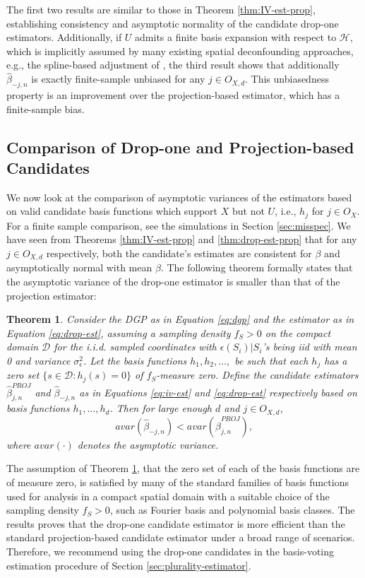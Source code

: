 \documentclass[
  12pt]{article}
\newcommand{\calD}{\mathcal{D}}
\newcommand{\calH}{\mathcal{H}}
\newtheorem{theorem}{Theorem}
\begin{document}
The first two results are similar to those in Theorem \ref{thm:IV-est-prop}, establishing consistency and asymptotic normality of the candidate drop-one estimators. Additionally, if $U$ admits a finite basis expansion with respect to $\calH$, which is implicitly assumed by many existing spatial deconfounding approaches, e.g., the spline-based adjustment of \cite{keller2020selecting}, the third result shows that additionally  $\hat{\beta}_{-j,n}$ is exactly finite-sample unbiased for any $j \in O_{X,d}$. This unbiasedness property is an improvement over the projection-based estimator, which has a finite-sample bias. 

\subsection{Comparison of Drop-one and Projection-based Candidates}\label{sec:drop-one-vs-proj-sd}
We now look at the comparison of asymptotic variances of the estimators based on valid candidate basis functions which support $X$ but not $U$, i.e., $h_j$ for $j \in O_X$. For a finite sample comparison, see the simulations in Section \ref{sec:misspec}. We have seen from Theorems \ref{thm:IV-est-prop} and \ref{thm:drop-est-prop} that for any $j \in O_{X,d}$ respectively, both the candidate's estimates are consistent for $\beta$ and asymptotically normal with mean $\beta$. The following theorem formally states that the asymptotic variance of the drop-one estimator is smaller than that of the projection estimator:
\begin{theorem}\label{thm:asm-var-comparison}
    Consider the DGP as in Equation \ref{eq:dgp} and the estimator as in Equation \ref{eq:drop-est}, assuming a sampling density $f_S > 0$ on the compact domain $\calD$ for the i.i.d. sampled coordinates with $\epsilon(S_i)|S_i$'s being iid with mean 0 and variance $\sigma^2_\epsilon$. Let the basis functions $h_1,h_2,\ldots,$ be such that each $h_j$ has a zero set $\{s \in \calD : h_j(s)=0\}$ of $f_S$-measure zero. Define the candidate estimators $\hat{\beta}^{PROJ}_{j,n}$ and $\hat{\beta}_{-j,n}$ as in Equations \ref{eq:iv-est} and \ref{eq:drop-est} respectively based on basis functions $h_1,\ldots,h_d$. Then for large enough $d$ and $j \in O_{X,d}$, 
    $$
    avar\left(\hat{\beta}_{-j,n}\right)
    <
    avar\left(\hat{\beta}^{PROJ}_{j,n}\right),
    $$
    where $avar(\cdot)$ denotes the asymptotic variance.
\end{theorem}
The  assumption of Theorem \ref{thm:asm-var-comparison}, that the zero set of each of the basis functions are of measure zero, is %
satisfied by many of the standard families of basis functions used for analysis in a compact spatial domain with a suitable choice of the sampling density $f_S>0$, such as Fourier basis and polynomial basis classes. The results proves that the drop-one candidate estimator is more efficient than the standard projection-based candidate estimator under a broad range of scenarios. Therefore, we recommend using the drop-one candidates in the basis-voting estimation procedure of Section \ref{sec:plurality-estimator}.
\end{document}
